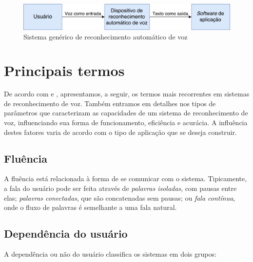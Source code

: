 \begin{figure}[H]
  \centering
  \includegraphics[width=.9\textwidth]{image/generic-stt.pdf}
  \caption{Sistema genérico de reconhecimento automático de voz \citep{sttComponentsParameters}}
  \label{generic-stt}
\end{figure}


\section{Principais termos}

De acordo com \citep{sttComponentsParameters} e \citep{sttBasics}, apresentamos, a seguir, os termos mais recorrentes em sistemas de reconhecimento de voz. Também entramos em detalhes nos tipos de parâmetros que caracterizam as capacidades de um sistema de reconhecimento de voz, influenciando sua forma de funcionamento, eficiência e acurácia. A influência destes fatores varia de acordo com o tipo de aplicação que se deseja construir.


\subsection{Fluência}

A fluência está relacionada à forma de se comunicar com o sistema. Tipicamente, a fala do usuário pode ser feita através de \emph{palavras isoladas}, com pausas entre elas; \emph{palavras conectadas}, que são concatenadas sem pausas; ou \emph{fala contínua}, onde o fluxo de palavras é semelhante a uma fala natural.


\subsection{Dependência do usuário}

A dependência ou não do usuário classifica os sistemas em dois grupos:

